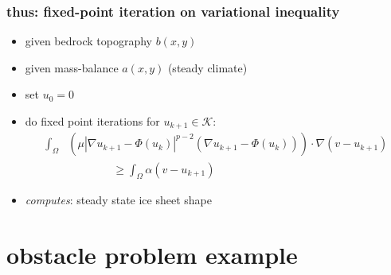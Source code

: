 \documentclass{beamer}
\begin{document}
\begin{frame}
  \frametitle{thus: fixed-point iteration on variational inequality} 

\begin{itemize}
\item given bedrock topography $b(x,y)$
\item given mass-balance $a(x,y)$ (steady climate)
\item set $u_0 = 0$
\item do fixed point iterations for $u_{k+1} \in \mathcal{K}$:
\begin{align*}
\int_{\Omega} &\left( \mu |\nabla u_{k+1} - \Phi(u_k)|^{p-2}
(\nabla u_{k+1} - \Phi(u_k) ) \right) \cdot \nabla (v - u_{k+1}) \\
&\qquad\qquad \ge \int_{\Omega} \alpha (v -  u_{k+1})
\end{align*}

\bigskip
\item \emph{computes}: steady state ice sheet shape
\end{itemize}
\end{frame}



\section[obstacle]{obstacle problem example}
\end{document}
